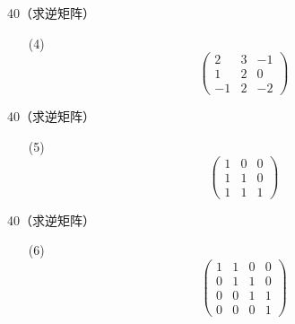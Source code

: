 \begin{frame}
  \begin{footnotesize}
    \begin{li}{40（求逆矩阵）}
      \begin{itemize}
      \item[(4)]
        $$
        \left(
        \begin{array}{rrr}
          2&3&-1\\
          1&2&0\\
          -1&2&-2
        \end{array}
        \right)
        $$
      \end{itemize}
    \end{li}
  \end{footnotesize}
\end{frame}

\begin{frame}
  \begin{footnotesize}
    \begin{li}{40（求逆矩阵）}
      \begin{itemize}
      \item[(5)]
        $$
        \left(
        \begin{array}{rrr}
          1&0&0\\
          1&1&0\\
          1&1&1
        \end{array}
        \right)
        $$
      \end{itemize}
    \end{li}
  \end{footnotesize}
\end{frame}

\begin{frame}
  \begin{footnotesize}
    \begin{li}{40（求逆矩阵）}
      \begin{itemize}
      \item[(6)]
        $$
        \left(
        \begin{array}{rrrr}
          1&1&0&0\\
          0&1&1&0\\
          0&0&1&1\\
          0&0&0&1
        \end{array}
        \right)
        $$
      \end{itemize}
    \end{li}
  \end{footnotesize}
\end{frame}


